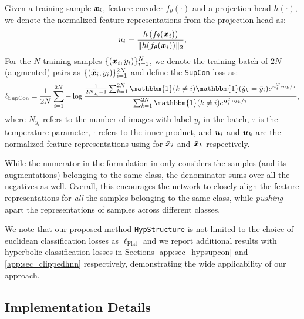 \begin{definition} 


Given a training sample ${\bm{x}}_i$, feature encoder $f_\theta(\cdot)$ and a projection head $h(\cdot)$, we denote the normalized feature representations from the projection head as: 
\begin{equation}
\label{eq:normalizedhead}
u_i = \frac{h\left(f_\theta({\bm{x}}_i)\right)}{\|h(f_\theta({\bm{x}}_i))\|_2},
\end{equation}
\noindent For the $N$ training samples $\{({\bm{x}}_i, y_i)\}_{i=1}^N$, we denote the training batch of $2N$ (augmented) pairs as $\{(\tilde {{\bm{x}}}_i, \tilde  y_i)\}_{i=1}^{2N}$ and define the \texttt{SupCon} loss as:
\begin{equation}
\label{eq:supcon}
    \lsupcon= \frac{1}{2N}\sum_{i=1}^{2N}  -\log\frac{ \frac{1}{2N_{y_i} - 1}\sum_{k=1}^{2N} \mathbbm{1}(k \neq i)\mathbbm{1}(\tilde y_k = \tilde y_i) e^{\vu_i^T \cdot \vu_k/\tau}}{\sum_{k=1}^{2N} \mathbbm{1}(k \neq i) e^{\vu_i^T \cdot \vu_k/\tau}},
\end{equation}
\noindent where $N_{y_i}$ refers to the number of images with label $y_i$ in the batch, $\tau$ is the temperature parameter, $\cdot$ refers to the inner product, and ${\bm{u}}_i$ and ${\bm{u}}_k$ are the normalized feature representations using  for $\tilde {{\bm{x}}}_i$ and $\tilde {{\bm{x}}}_k$ respectively.

\end{definition}

While the numerator in the formulation in  only considers the samples (and its augmentations) belonging to the same class, the denominator sums over all the negatives as well. Overall, this encourages the network to closely align the feature representations for \emph{all} the samples belonging to the same class, while \emph{pushing} apart the representations of samples across different classes. 

We note that our proposed method \texttt{HypStructure} is not limited to the choice of euclidean classification losses as $\ell_\text{Flat}$ and we report additional results with hyperbolic classification losses in Sections \ref{app:sec_hypsupcon} and \ref{app:sec_clippedhnn} respectively, demonstrating the wide applicability of our approach. 

\subsection{Implementation Details}
\label{app:exp_details_params}

